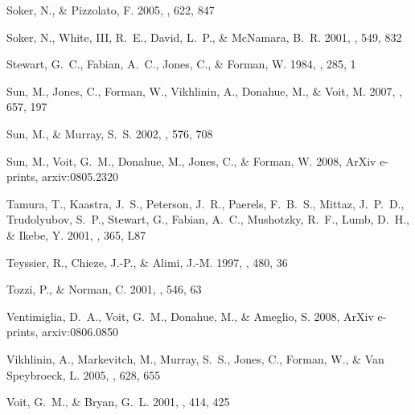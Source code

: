 \documentclass[12pt,preprint]{aastex}
\begin{document}
\begin{thebibliography}{139}
{Soker}, N., \& {Pizzolato}, F. 2005, \apj, 622, 847

{Soker}, N., {White}, III, R.~E., {David}, L.~P., \& {McNamara}, B.~R. 2001,
  \apj, 549, 832

{Stewart}, G.~C., {Fabian}, A.~C., {Jones}, C., \& {Forman}, W. 1984, \apj,
  285, 1

{Sun}, M., {Jones}, C., {Forman}, W., {Vikhlinin}, A., {Donahue}, M., \&
  {Voit}, M. 2007, \apj, 657, 197

{Sun}, M., \& {Murray}, S.~S. 2002, \apj, 576, 708

{Sun}, M., {Voit}, G.~M., {Donahue}, M., {Jones}, C., \& {Forman}, W. 2008,
  ArXiv e-prints, arxiv:0805.2320

{Tamura}, T., {Kaastra}, J.~S., {Peterson}, J.~R., {Paerels}, F.~B.~S.,
  {Mittaz}, J.~P.~D., {Trudolyubov}, S.~P., {Stewart}, G., {Fabian}, A.~C.,
  {Mushotzky}, R.~F., {Lumb}, D.~H., \& {Ikebe}, Y. 2001, \aap, 365, L87

{Teyssier}, R., {Chieze}, J.-P., \& {Alimi}, J.-M. 1997, \apj, 480, 36

{Tozzi}, P., \& {Norman}, C. 2001, \apj, 546, 63

{Ventimiglia}, D.~A., {Voit}, G.~M., {Donahue}, M., \& {Ameglio}, S. 2008,
  ArXiv e-prints, arxiv:0806.0850

{Vikhlinin}, A., {Markevitch}, M., {Murray}, S.~S., {Jones}, C., {Forman}, W.,
  \& {Van Speybroeck}, L. 2005, \apj, 628, 655

{Voit}, G.~M., \& {Bryan}, G.~L. 2001, \nat, 414, 425


\end{thebibliography}
\end{document}
